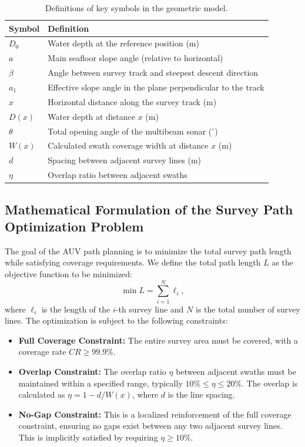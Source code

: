 \documentclass[compress]{cm}
\begin{document}
\begin{table}[H]
	\centering
	\caption{Definitions of key symbols in the geometric model.}
	\label{tab:table1}
	\footnotesize
	\renewcommand{\arraystretch}{1.2}
	\begin{tabular}{ll}
		\toprule[1bp]
		\textbf{Symbol} & \textbf{Definition} \\
		\midrule[1bp]
		$D_0$ & Water depth at the reference position (m) \\
		$a$ & Main seafloor slope angle (relative to horizontal) \\
		$\beta$ & Angle between survey track and steepest descent direction \\
		$a_1$ & Effective slope angle in the plane perpendicular to the track \\
		$x$ & Horizontal distance along the survey track (m) \\
		$D(x)$ & Water depth at distance $x$ (m) \\
		$\theta$ & Total opening angle of the multibeam sonar ($^{\circ}$) \\
		$W(x)$ & Calculated swath coverage width at distance $x$ (m) \\
		$d$ & Spacing between adjacent survey lines (m) \\
		$\eta$ & Overlap ratio between adjacent swaths \\
		\bottomrule[1bp]
	\end{tabular}
\end{table}

\subsection{Mathematical Formulation of the Survey Path Optimization Problem}
The goal of the AUV path planning is to minimize the total survey path length while satisfying coverage requirements. We define the total path length $L$ as the objective function to be minimized:
\begin{equation}
\min L = \sum_{i=1}^{N} \ell_i,
\end{equation}
where $\ell_i$ is the length of the $i$-th survey line and $N$ is the total number of survey lines. The optimization is subject to the following constraints:
\begin{itemize}
    \item \textbf{Full Coverage Constraint:} The entire survey area must be covered, with a coverage rate $CR \geq 99.9\%$.
    \item \textbf{Overlap Constraint:} The overlap ratio $\eta$ between adjacent swaths must be maintained within a specified range, typically $10\% \leq \eta \leq 20\%$. The overlap is calculated as $\eta = 1 - d/W(x)$, where $d$ is the line spacing.
    \item \textbf{No-Gap Constraint:} This is a localized reinforcement of the full coverage constraint, ensuring no gaps exist between any two adjacent survey lines. This is implicitly satisfied by requiring $\eta \geq 10\%$.
\end{itemize}
\end{document}
